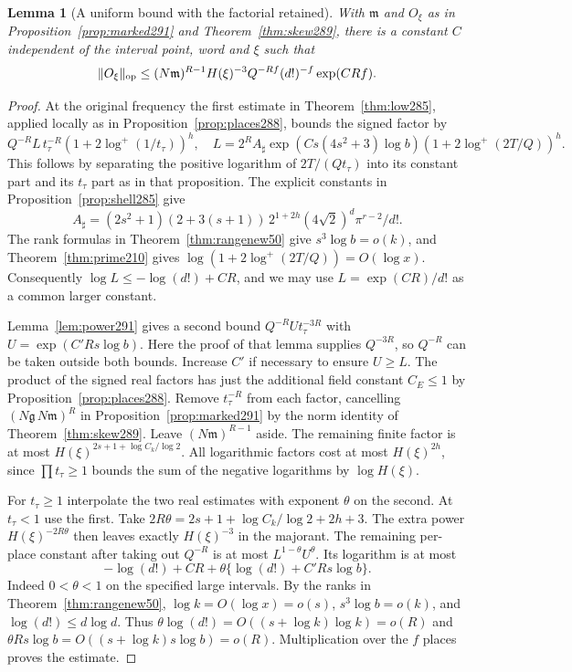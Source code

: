 \documentclass[a4paper,11pt]{article}
\newtheorem{lemma}[proposition]{Lemma}
\theoremstyle{definition}
\theoremstyle{remark}
\numberwithin{equation}{section}
\begin{document}
\begin{lemma}[A uniform bound with the factorial retained]\leavevmode
\label{lem:factorial291}
With \(\mathfrak m\) and \(O_\xi\) as in
Proposition~\ref{prop:marked291} and Theorem~\ref{thm:skew289},
there is a constant \(C\) independent of the interval
point, word and \(\xi\) such that
\[
 \|O_\xi\|_{\rm op}\le
    (N\mathfrak m)^{R-1} H(\xi)^{-3}
          Q^{-Rf}(d!)^{-f}\exp(C R f).
\]
\end{lemma}
\begin{proof}
At the original frequency the first estimate in
Theorem~\ref{thm:low285}, applied locally as in
Proposition~\ref{prop:places288}, bounds the signed factor by
\[
 Q^{-R} L\,t_\tau^{-R}
             (1+2\log^+(1/t_\tau))^h,\quad
 L= 2^R A_\sharp \exp(C s(4s^2+3)\log b)
                  (1+2\log^+(2T/Q))^h .
\]
This follows by separating the positive logarithm of
\(2T/(Qt_\tau)\) into its constant part and its \(t_\tau\)
part as in that proposition. The explicit constants in
Proposition~\ref{prop:shell285} give
\[
 A_\sharp=(2s^2+1)(2+3(s+1))\,
                 2^{1+2h}(4\sqrt2)^d\pi^{r-2}/d! .
\]
The rank formulas in Theorem~\ref{thm:rangenew50} give
\(s^3\log b=o(k)\), and Theorem~\ref{thm:prime210} gives
\(\log(1+2\log^+(2T/Q))=O(\log x)\). Consequently
\(\log L\le-\log(d!)+C R\), and we may use
\(L=\exp(C R)/d!\) as a common larger constant.

Lemma~\ref{lem:power291} gives a second bound
\(Q^{-R} U t_\tau^{-3R}\) with \(U=\exp(C'R s\log b)\).
Here the proof of that lemma supplies \(Q^{-3R}\), so
\(Q^{-R}\) can be taken outside both bounds. Increase \(C'\)
if necessary to ensure \(U\ge L\).
The product of the signed real factors has just the
additional field constant \(C_E\le1\) by
Proposition~\ref{prop:places288}. Remove \(t_\tau^{-R}\)
from each factor, cancelling
\((N\mathfrak g\,N\mathfrak m)^R\) in
Proposition~\ref{prop:marked291} by the norm identity of
Theorem~\ref{thm:skew289}. Leave
\((N\mathfrak m)^{R-1}\) aside. The remaining finite
factor is at most \(H(\xi)^{2s+1+\log C_k/\log2}\).
All logarithmic factors cost at most \(H(\xi)^{2h}\),
since \(\prod t_\tau\ge1\) bounds the sum of the
negative logarithms by \(\log H(\xi)\).

For \(t_\tau\ge1\) interpolate the two real estimates with
exponent \(\theta\) on the second. At \(t_\tau<1\) use the
first. Take \(2R\theta=2s+1+\log C_k/\log 2+2h+3\).
The extra power \(H(\xi)^{-2R\theta}\) then leaves exactly
\(H(\xi)^{-3}\) in the majorant. The remaining per-place
constant after taking out \(Q^{-R}\) is at most
\(L^{1-\theta}U^\theta\). Its logarithm is at most
\[
  -\log(d!)+ C R+\theta\{\log(d!)+C'Rs\log b\}.
\]
Indeed \(0<\theta<1\) on the specified large intervals.
By the ranks in Theorem~\ref{thm:rangenew50},
\(\log k=O(\log x)=o(s)\), \(s^3\log b=o(k)\), and
\(\log(d!)\le d\log d\). Thus
\(\theta\log(d!)=O((s+\log k)\log k)=o(R)\) and
\(\theta R s\log b=O((s+\log k)s\log b)=o(R)\).
Multiplication over the \(f\) places proves the estimate.
\end{proof}
\end{document}
